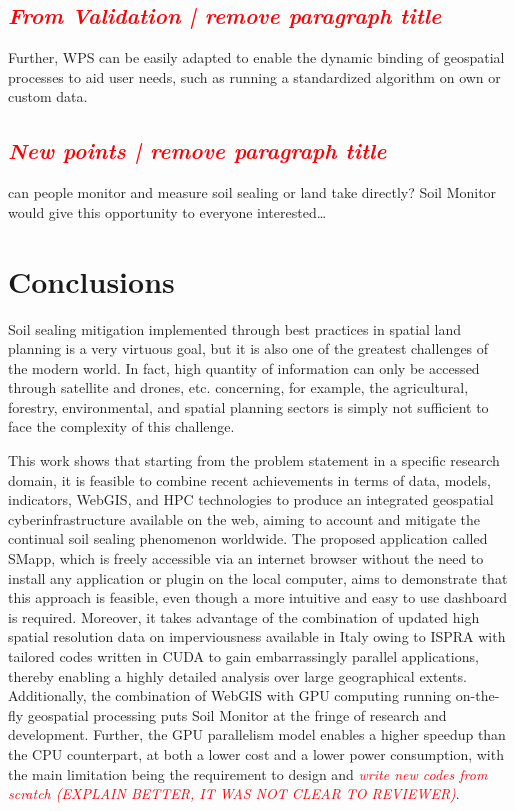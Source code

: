 \documentclass[APA,LATO1COL,doublespace]{WileyNJD-v2}
\newcommand{\toberevised}[1]{\emph{\textcolor{red}{#1}}} %
\begin{document}
\subsection{\toberevised{From Validation | remove paragraph title}}
Further, WPS can be easily adapted to enable the dynamic binding of geospatial processes to aid user needs, such as running a standardized algorithm on own or custom data.


\subsection{ \toberevised{New points | remove paragraph title}}
 can people monitor and measure soil sealing or land take directly? Soil Monitor would give this opportunity to everyone interested\ldots



\section{Conclusions}
Soil sealing mitigation implemented through best practices in spatial land planning is a very virtuous goal, but it is also one of the greatest challenges of the modern world. 
In fact, high quantity of information can only be accessed through satellite and drones, etc. concerning, for example, the agricultural, forestry, environmental, and spatial planning sectors is simply not sufficient to face the complexity of this challenge.

This work shows that starting from the problem statement in a specific research domain, it is feasible to combine recent achievements in terms of data, models, indicators, WebGIS, and HPC technologies to produce an integrated geospatial cyberinfrastructure available on the web, aiming to account and mitigate the continual soil sealing phenomenon worldwide. 
The proposed application called SMapp, which is freely accessible via an internet browser without the need to install any application or plugin on the local computer, aims to demonstrate that this approach is feasible, even though a more intuitive and easy to use dashboard is required.
Moreover, it takes advantage of the combination of updated high spatial resolution data on imperviousness available in Italy owing to ISPRA with tailored codes written in CUDA to gain embarrassingly parallel applications, thereby enabling a highly detailed analysis over large geographical extents.
Additionally, the combination of WebGIS with GPU computing running on-the-fly geospatial processing puts Soil Monitor at the fringe of research and development. 
Further, the GPU parallelism model enables a higher speedup than the CPU counterpart, at both a lower cost and a lower power consumption, with the main limitation being the requirement to design and \toberevised{write new codes from scratch (EXPLAIN BETTER, IT WAS NOT CLEAR TO REVIEWER)}.
\end{document}
